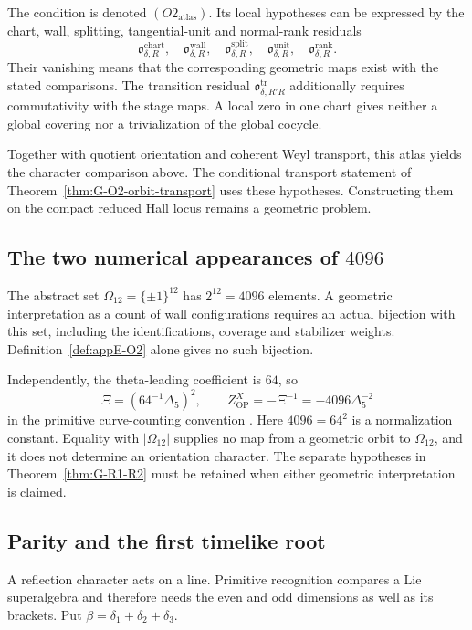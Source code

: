 The condition is denoted \((O2_{\mathrm{atlas}})\).
Its local hypotheses can be expressed by the chart, wall, splitting,
tangential-unit and normal-rank residuals
\[
 \mathfrak o^{\mathrm{chart}}_{\delta,R},\quad
 \mathfrak o^{\mathrm{wall}}_{\delta,R},\quad
 \mathfrak o^{\mathrm{split}}_{\delta,R},\quad
 \mathfrak o^{\mathrm{unit}}_{\delta,R},\quad
 \mathfrak o^{\mathrm{rank}}_{\delta,R}.
\]
Their vanishing means that the corresponding geometric maps exist
with the stated comparisons. The transition residual
\(\mathfrak o^{\mathrm{tr}}_{\delta,R'R}\) additionally requires
commutativity with the stage maps. A local zero in one chart gives
neither a global covering nor a trivialization of the global cocycle.

Together with quotient orientation and coherent Weyl transport,
this atlas yields the character comparison above. The conditional
transport statement of Theorem~\ref{thm:G-O2-orbit-transport} uses
these hypotheses. Constructing them on the compact reduced Hall
locus remains a geometric problem.

\subsection{The two numerical appearances of \(4096\)}
\label{app:pfaffian-wall-O2-4096}

The abstract set \(\Omega_{12}=\{\pm1\}^{12}\) has
\(2^{12}=4096\) elements. A geometric interpretation as a count of
wall configurations requires an actual bijection with this set,
including the identifications, coverage and stabilizer weights.
Definition~\ref{def:appE-O2} alone gives no such bijection.

Independently, the theta-leading coefficient is \(64\), so
\[
 \Xi=(64^{-1}\Delta_5)^2,\qquad
 Z^X_{\mathrm{OP}}=-\Xi^{-1}=-4096\Delta_5^{-2}
\]
in the primitive curve-counting convention
\cite{OB,OPand}. Here \(4096=64^2\) is a normalization constant.
Equality with \(|\Omega_{12}|\) supplies no map from a geometric
orbit to \(\Omega_{12}\), and it does not determine an orientation
character. The separate hypotheses in
Theorem~\ref{thm:G-R1-R2} must be retained when either geometric
interpretation is claimed.

\subsection{Parity and the first timelike root}
\label{app:pfaffian-wall-recognition}

A reflection character acts on a line. Primitive recognition compares
a Lie superalgebra and therefore needs the even and odd dimensions
as well as its brackets. Put
\(\beta=\delta_1+\delta_2+\delta_3\).

